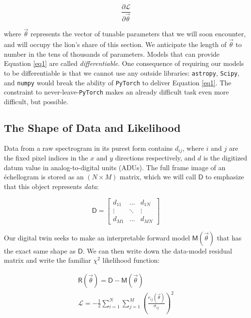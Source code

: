 \documentclass[twocolumn]{aastex631}
\begin{document}
\begin{equation}
  \frac{\partial{\mathcal{L}}}{\partial{\vec{\theta}}} \label{eq1}
\end{equation}

\noindent where $\vec{\theta}$ represents the vector of tunable parameters that we will soon encounter, and will occupy the lion's share of this section.  We anticipate the length of $\vec{\theta}$ to number in the tens of thousands of parameters.  Models that can provide Equation \ref{eq1} are called \emph{differentiable}.  One consequence of requiring our models to be differentiable is that we cannot use any outside libraries: \texttt{astropy}, \texttt{Scipy}, and \texttt{numpy} would break the ability of \texttt{PyTorch} to deliver Equation \ref{eq1}.  The constraint to never-leave-\texttt{PyTorch} makes an already difficult task even more difficult, but possible.

\subsection{The Shape of Data and Likelihood}
Data from a raw spectrogram in its purest form contains $d_{ij}$, where $i$ and $j$ are the fixed pixel indices in the $x$ and $y$ directions respectively, and $d$ is the digitized datum value in analog-to-digital units (ADUs).  The full frame image of an \'echellogram is stored as an $(N \times M)$ matrix, which we will call $\boldsymbol{\mathsf{D}}$ to emphasize that this object represents \emph{data}:

\begin{equation}
  \boldsymbol{\mathsf{D}} =  \begin{bmatrix}
    d_{11} & \dots  & d_{1N}                       \\
    \vdots & \ddots & \vdots                       \\
    d_{M1} & \dots  & d_{MN} \label{eqDenseMatrix}
  \end{bmatrix}
\end{equation}

Our digital twin seeks to make an interpretable forward model $\boldsymbol{\mathsf{M}}(\vec{\theta})$ that has the exact same shape as $\boldsymbol{\mathsf{D}}$.  We can then write down the data-model residual matrix and write the familiar $\chi^2$ likelihood function:

\begin{eqnarray}
  \boldsymbol{\mathsf{R}}(\vec{\theta}) = \boldsymbol{\mathsf{D}} - \boldsymbol{\mathsf{M}}(\vec{\theta}) \\
  \mathcal{L} = -\frac{1}{2} \sum_{i=1}^{N}\sum_{j=1}^{M} \left ( \frac{r_{ij}(\vec{\theta})}{\sigma_{ij}} \right )^2 \label{eqChiSq}
\end{eqnarray}
\end{document}
